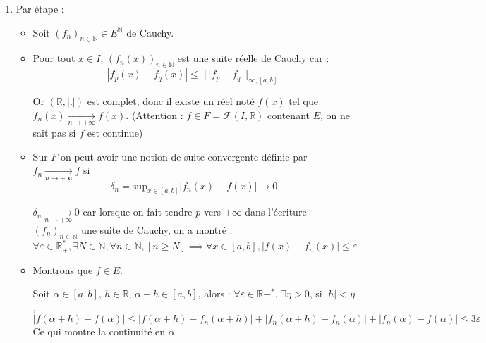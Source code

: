 \begin{myproof}{}{}
\begin{enumerate}
  \item Par étape :
    \begin{itemize}
      \item Soit $(f_n)_{n \in \mathbb{N}} \in E^{\mathbb{N}}$  de Cauchy. 
      \item Pour tout $x \in I$, $(f_n(x))_{n \in \mathbb{N}}$ est une suite réelle de Cauchy car :
        \[
          |f_p(x) - f_q(x) | \le \| f_p - f_q \| _{\infty, [a,b]}
        \]
        
        Or $(\mathbb{R}, |.|)$ est complet, donc il existe un réel noté $f(x)$ tel que $f_n(x) \underset{n \to +\infty}{\longrightarrow} f(x)$. (Attention : $f \in F = \mathscr{F}(I, \mathbb{R})$ contenant $E$, on ne sait pas si $f$ est continue)

      \item Sur $F$ on peut avoir une notion de suite convergente définie par $f_n \underset{n \to +\infty}{\longrightarrow} f$ si 
        \[
          \delta_n = \mathrm{sup} _{x \in [a,b]} |f_n(x) - f(x) | \to 0
        \]

      $\delta_n \underset{n \to + \infty}{\longrightarrow} 0$ car lorsque on fait tendre $p$ vers $+ \infty$ dans l'écriture $(f_n) _{n \in \mathbb{N}}$ une suite de Cauchy, on a montré :
      \[
        \forall \varepsilon \in \mathbb{R}_+^*, \exists N \in \mathbb{N}, \forall n \in \mathbb{N}, [n \ge N] \implies \forall x\in [a,b], |f(x) - f_n(x) | \le \varepsilon
      \]

      \item Montrons que $f \in E$.

        Soit $\alpha \in [a, b]$, $h \in \mathbb{R}$, $\alpha+h \in [a,b]$, alors : $\forall \varepsilon \in \mathbb{R}+^*$, $\exists \eta >0$, si $|h| < \eta$,
        \[
          |f(\alpha+h) - f(\alpha)| \le |f(\alpha+h) - f_n(\alpha+h)| + | f_n(\alpha+h) -f_n(\alpha) | + |f_n(\alpha) - f(\alpha)| \le 3\varepsilon
        \]
        Ce qui montre la continuité en $\alpha$.


\end{itemize}
\end{enumerate}
\end{myproof}
